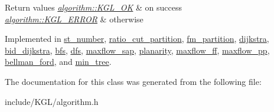 \begin{DoxyRetVals}{Return values}
{\em \mbox{\hyperlink{classalgorithm_af1a0078e153aa99c24f9bdf0d97f6710aae4c1cd7fe8d8cf4b143241a6e7c31cf}{algorithm\+::\+K\+G\+L\+\_\+\+OK}}} & on success \\
\hline
{\em \mbox{\hyperlink{classalgorithm_af1a0078e153aa99c24f9bdf0d97f6710ae67bf27b2ef31f73e545a7f9f4a69556}{algorithm\+::\+K\+G\+L\+\_\+\+E\+R\+R\+OR}}} & otherwise \\
\hline
\end{DoxyRetVals}


Implemented in \mbox{\hyperlink{classst__number_a02f5a12e151f29839f6f12a2d45523a7}{st\+\_\+number}}, \mbox{\hyperlink{classratio__cut__partition_a640cf0da64358d0e0af167c32458ac51}{ratio\+\_\+cut\+\_\+partition}}, \mbox{\hyperlink{classfm__partition_a509615ef1f11bc2334a96c35adafd28e}{fm\+\_\+partition}}, \mbox{\hyperlink{classdijkstra_a4a001133b2d94fd7cd2012ff18b5139b}{dijkstra}}, \mbox{\hyperlink{classbid__dijkstra_a819e72158a0c594ec5d8bcf07b6a435a}{bid\+\_\+dijkstra}}, \mbox{\hyperlink{classbfs_aaeebfe1628febd8d4ba658efc0ef51ed}{bfs}}, \mbox{\hyperlink{classdfs_af0863b8974d5fd58cd0375c78ed8163b}{dfs}}, \mbox{\hyperlink{classmaxflow__sap_ab46f7d6fbabeaf7b252b9f9a0e018f24}{maxflow\+\_\+sap}}, \mbox{\hyperlink{classplanarity_afec6108c6b48164d6e1451b6be49d033}{planarity}}, \mbox{\hyperlink{classmaxflow__ff_a0060613409391c3a6d7e6fe473af21f1}{maxflow\+\_\+ff}}, \mbox{\hyperlink{classmaxflow__pp_a6c6fa792d7f0441048361778697e8e1e}{maxflow\+\_\+pp}}, \mbox{\hyperlink{classbellman__ford_a2c15782095c4fc37eb2a8d66c431c821}{bellman\+\_\+ford}}, and \mbox{\hyperlink{classmin__tree_ac025e8dad0db7a6a1e0e7b476b547802}{min\+\_\+tree}}.



The documentation for this class was generated from the following file\+:\begin{DoxyCompactItemize}
\item 
include/\+K\+G\+L/algorithm.\+h\end{DoxyCompactItemize}
